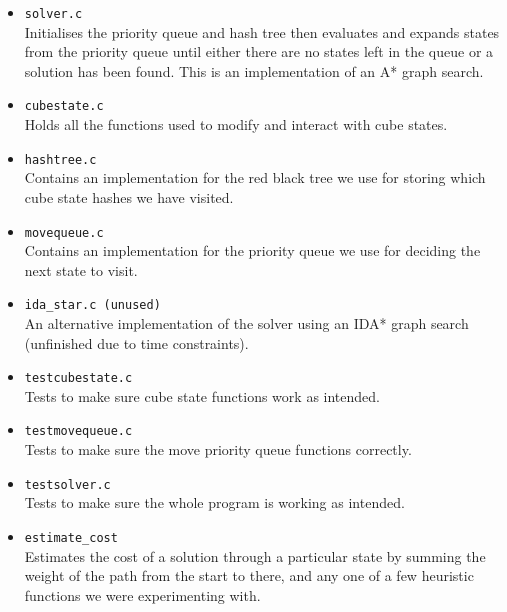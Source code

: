 \documentclass[8pt]{article}
\begin{document}
\begin{minipage}{0.45\textwidth}
    \begin{itemize}
        \item \texttt{solver.c} \\ Initialises the priority queue and hash tree then
        evaluates and expands states from the priority queue until either there are no states
        left in the queue or a solution has been found. This is an
        implementation of an A* graph search.
        \item \texttt{cubestate.c} \\ Holds all the functions used to modify and interact
        with cube states.
        \item \texttt{hashtree.c}\\  Contains an implementation for the red black tree we
        use for storing which cube state hashes we have visited.
        \item \texttt{movequeue.c}\\ Contains an implementation for the priority queue we use
        for deciding the next state to visit.
        \item \texttt{ida\_star.c (unused)}\\ An alternative implementation
        of the solver using an IDA* graph search (unfinished due to time constraints).
        \item \texttt{testcubestate.c}\\ Tests to make sure cube state functions
        work as intended.
        \item \texttt{testmovequeue.c}\\ Tests to make sure the move priority queue
        functions correctly.
        \item \texttt{testsolver.c}\\ Tests to make sure the whole program is working as
        intended.
        \item \texttt{estimate\_cost}\\ Estimates the cost of a solution through a particular
        state by summing the weight of the path from the start to there, and any one of a few heuristic functions
        we were experimenting with.


    \end{itemize}
    \end{minipage}%
    \hfill
\end{document}
